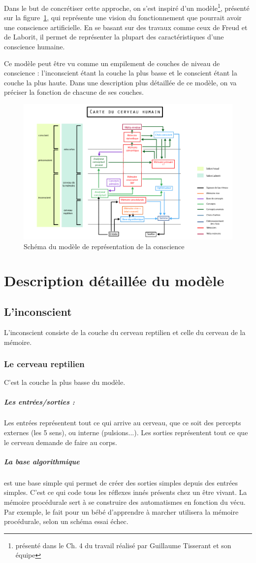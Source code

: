 Dans le but de concrétiser cette approche, on
s'est inspiré d'un modèle\footnote{présenté dans le Ch. 4 du travail réalisé par
\mbox{Guillaume} \mbox{Tisserant} et son équipe}, présenté sur la
figure~\ref{modele_original}, qui représente une vision du fonctionnement que
pourrait avoir une conscience artificielle. En se basant sur des travaux comme
ceux de Freud et de Laborit, il permet de représenter la plupart des caractéristiques
d’une conscience humaine.

Ce modèle peut être vu comme un empilement  de couches de niveau de conscience :
l'inconscient étant la couche la plus basse et le conscient étant la couche la
plus haute. Dans une description plus détaillée de ce modèle, on va préciser la
fonction de chacune de ses couches.

\begin{figure}[H] 
\centering
\includegraphics[width=\textwidth]{files/modele_original} 
\caption{Schéma du modèle de représentation de la conscience} 
\label{modele_original}
\end{figure}

\section{Description détaillée du modèle}
\subsection{L’inconscient}
L'inconscient consiste de la couche du cerveau reptilien et celle du cerveau de
la mémoire.
\subsubsection{Le cerveau reptilien} C'est la couche la plus basse du modèle.
\subparagraph{Les entrées/sorties :} Les entrées représentent tout ce qui arrive
au cerveau, que ce soit des percepts externes (les 5 sens), ou interne (pulsions...). Les sorties représentent tout
ce que le cerveau demande de faire au corps. 
\subparagraph{La base algorithmique} est une base
simple qui permet de créer des sorties simples depuis des entrées simples. C’est
ce qui code tous les réflexes innés présents chez un être vivant. La mémoire
procédurale sert à se construire des automatismes en fonction du vécu. Par
exemple, le fait pour un bébé d’apprendre à marcher utilisera la mémoire
procédurale, selon un schéma essai échec.
